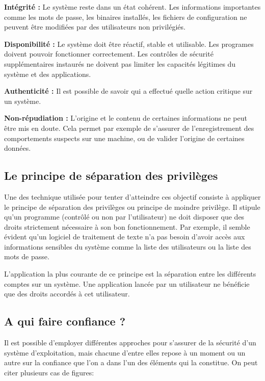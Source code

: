 \textbf{Intégrité :}
Le système reste dans un état cohérent. Les informations importantes comme les mots de passe, les binaires installés, les fichiers de configuration ne peuvent être modifiées par des utilisateurs non privilégiés.

\textbf{Disponibilité :}
Le système doit être réactif, stable et utilisable. Les programes doivent pouvoir fonctionner correctement. Les contrôles de sécurité supplémentaires instaurés ne doivent pas limiter les capacités légitimes du système et des applications.

\textbf{Authenticité :}
Il est possible de savoir qui a effectué quelle action critique sur un système.

\textbf{Non-répudiation :}
L'origine et le contenu de certaines informations ne peut être mis en doute. Cela permet par exemple de s'assurer de l'enregistrement des comportements suspects sur une machine, ou de valider l'origine de certaines données.

\subsection{Le principe de séparation des privilèges}

Une des technique utilisée pour tenter d'atteindre ces objectif consiste à appliquer le principe de séparation des privilèges ou principe de moindre privilège. Il stipule qu'un programme (contrôlé ou non par l'utilisateur) ne doit disposer que des droits strictement nécessaire à son bon fonctionnement. Par exemple, il semble évident qu'un logiciel de traitement de texte n'a pas besoin d'avoir accès aux informations sensibles du système comme la liste des utilisateurs ou la liste des mots de passe.

L'application la plus courante de ce principe est la séparation entre les différents comptes sur un système. Une application lancée par un utilisateur ne bénéficie que des droits accordés à cet utilisateur.

\subsection{A qui faire confiance ?}

Il est possible d'employer différentes approches pour s'assurer de la sécurité d'un système d'exploitation, mais chacune d'entre elles repose à un moment ou un autre sur la confiance que l'on a dans l'un des éléments qui la constitue. On peut citer plusieurs cas de figures\cite{WCS}:

